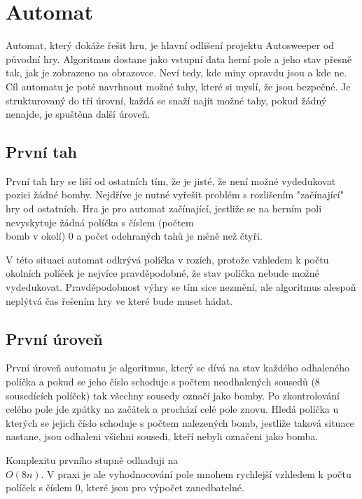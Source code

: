 \section{Automat}
Automat, který dokáže řešit hru, je hlavní odlišení projektu Autosweeper od původní hry. Algoritmus dostane jako vstupní data
herní pole a jeho stav přesně tak, jak je zobrazeno na obrazovce. Neví tedy, kde miny opravdu jsou a kde ne. Cíl automatu je
poté navrhnout možné tahy, které si myslí, že jsou bezpečné. Je strukturovaný do tří úrovní, každá se snaží najít možné tahy,
pokud žádný nenajde, je spuštěna další úroveň.

\subsection{První tah}
První tah hry se liší od ostatních tím, že je jisté, že není možné vydedukovat pozici žádné bomby. Nejdříve je nutné vyřešit
problém s rozlišením "začínající" hry od ostatních. Hra je pro automat začínající, jestliže se na herním poli nevyskytuje
žádná políčka s číslem (počtem \\bomb v okolí) 0 a počet odehraných tahů je méně než čtyři.

V této situaci automat odkrývá políčka v rozích, protože vzhledem k počtu okolních políček je nejvíce pravděpodobné, že stav
políčka nebude možné vydedukovat. \cite{bercerra2015} Pravděpodobnost výhry se tím sice nezmění, ale algoritmus alespoň neplýtvá
čas řešením hry ve které bude muset hádat.

\subsection{První úroveň}
První úroveň automatu je algoritmus, který se dívá na stav každého odhaleného políčka a pokud se jeho číslo schoduje s počtem
neodhalených sousedů (8 sousedících políček) tak všechny sousedy označí jako bomby. Po zkontrolování celého pole jde zpátky na
začátek a prochází celé pole znovu. Hledá políčka u kterých se jejich číslo schoduje s počtem nalezených bomb, jestliže taková
situace nastane, jsou odhaleni všichni sousedi, kteří nebyli označeni jako bomba.

Komplexitu prvního stupně odhaduji na \\$O(8n)$. V praxi je ale vyhodnocování pole mnohem rychlejší vzhledem k počtu políček s číslem 0, které jsou pro výpočet zanedbatelné.

